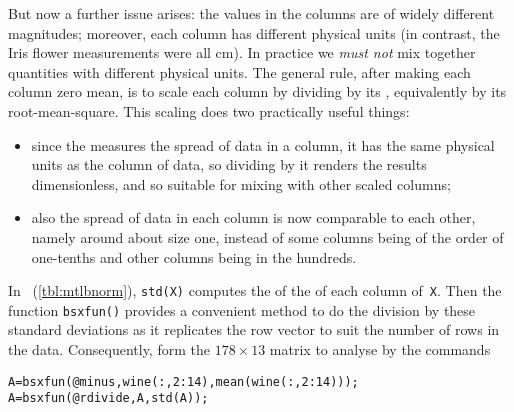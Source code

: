 \begin{example}
\begin{solution}
\begin{enumerate}
But now a further issue arises: the values in the columns are of widely different magnitudes; moreover, each column has different physical units (in contrast, the Iris flower measurements were all cm).
In practice we \emph{must not} mix together quantities with different physical units. 
The general rule, after making each column zero mean, is to scale each column by dividing by its , equivalently by its root-mean-square.
This scaling does two practically useful things: 
\begin{itemize}
\item since the  measures the spread of data in a column, it has the same physical units as the column of data, so dividing by it renders the results dimensionless, and so suitable for mixing with other scaled columns;
\item also the spread of data in each column is now comparable to each other, namely around about size one, instead of some columns being of the order of one-tenths and other columns being in the hundreds.
\end{itemize}
In \script\ (\autoref{tbl:mtlbnorm}), \verb|std(X)| computes the  of the  of each column of~\verb|X|.
Then the function \verb|bsxfun()|  provides a convenient method to do the division by these standard deviations as it replicates the row vector to suit the number of rows in the data.
Consequently, form the \(178\times13\) matrix to analyse by the commands
\begin{verbatim}
A=bsxfun(@minus,wine(:,2:14),mean(wine(:,2:14)));
A=bsxfun(@rdivide,A,std(A));
\end{verbatim}


\end{enumerate}
\end{solution}
\end{example}
